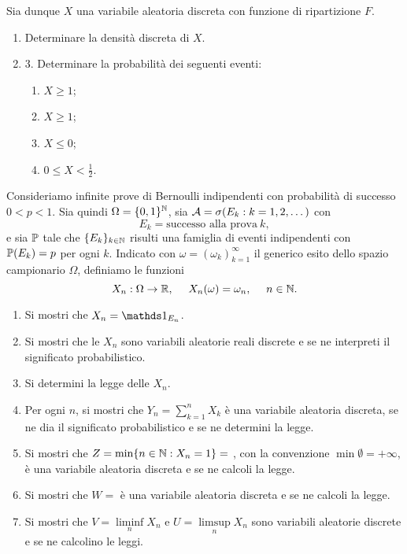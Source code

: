 Sia dunque $X$ una variabile aleatoria discreta con funzione di ripartizione $F$.
\begin{enumerate}
\item Determinare la densità discreta di $X$.
\item 3. Determinare la probabilità dei seguenti eventi:
\begin{enumerate}
\item $X\geq 1$;
\item $X\geq 1$;
\item $X\leq 0$;
\item $0\leq X< \frac{1}{2}$.
\end{enumerate}
\end{enumerate}


Consideriamo infinite prove di Bernoulli indipendenti con probabilità di successo $0< p< 1$. Sia quindi $\Omega =\{0,1\}^{\mathbb{N}}$, sia $\mathcal{A} =\sigma (E_{k} : k=1,2,\dots)$ con
\begin{equation*}
E_{k} =\text{successo alla prova} \ k,
\end{equation*}
e sia $\mathbb{P}$ tale che $\{E_{k}\}_{k\in \mathbb{N}}$ risulti una famiglia di eventi indipendenti con $\mathbb{P}(E_{k}) =p$ per ogni $k$. Indicato con $\omega =(\omega_{k})_{k=1}^{\infty }$ il generico esito dello spazio campionario $\Omega $, definiamo le funzioni
\begin{equation*}
X_{n} :\Omega \rightarrow \mathbb{R} ,\ \ \ \ X_{n}(\omega) =\omega_{n} ,\ \ \ \ n\in \mathbb{N} .
\end{equation*}
\begin{enumerate}
\item Si mostri che $X_{n} =\Ind_{E_{n}}$.
\item Si mostri che le $X_{n}$ sono variabili aleatorie reali discrete e se ne interpreti il significato probabilistico.
\item Si determini la legge delle $X_{n}$.
\item Per ogni $n$, si mostri che $Y_{n} =\sum_{k=1}^{n} X_{k}$ è una variabile aleatoria discreta, se ne dia il significato probabilistico e se ne determini la legge.
\item Si mostri che $Z=\min\{n\in \mathbb{N} :X_{n} =1\} =$ , con la convenzione $\min \emptyset =+\infty $, è una variabile aleatoria discreta e se ne calcoli la legge.
\item Si mostri che $W=$  è una variabile aleatoria discreta e se ne calcoli la legge.
\item Si mostri che $V=\liminf\limits_{n} X_{n}$ e $U=\limsup\limits_{n} X_{n}$ sono variabili aleatorie discrete e se ne calcolino le leggi.
\end{enumerate}

